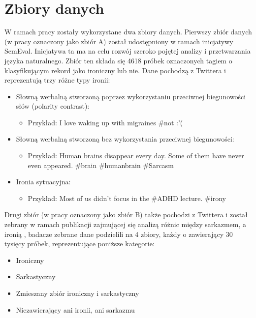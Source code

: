 \newpage %
\section{Zbiory danych} \label{dane_wejsciowe}



W ramach pracy zostały wykorzystane dwa zbiory danych. Pierwszy zbiór danych (w pracy oznaczony jako zbiór A) został udostępniony w ramach inicjatywy SemEval. Inicjatywa ta ma na celu rozwój szeroko pojętej analizy i przetwarzania języka naturalnego. Zbiór ten składa się 4618 próbek oznaczonych tagiem o klasyfikującym rekord jako ironiczny lub nie. Dane pochodzą z Twittera i reprezentują trzy różne typy ironii:
\begin{itemize}
    \item Słowną werbalną stworzoną poprzez wykorzystaniu przeciwnej biegunowości słów (polarity contrast):
          \begin{itemize}
              \item Przykład: I love waking up with migraines \#not :'(
          \end{itemize}

    \item Słowną werbalną stworzoną bez wykorzystania przeciwnej biegunowości:
          \begin{itemize}
              \item Przykład: Human brains disappear every day. Some of them have never even appeared. \#brain \#humanbrain \#Sarcasm
          \end{itemize}

    \item Ironia sytuacyjna:
          \begin{itemize}
              \item Przykład: Most of us didn't focus in the \#ADHD lecture. \#irony
          \end{itemize}
\end{itemize}



Drugi zbiór (w pracy oznaczony jako zbiór B) także pochodzi z Twittera i został zebrany w ramach publikacji zajmującej się analizą różnic między sarkazmem, a ironią  \cite{Ling2016}  , badacze zebrane dane podzielili na 4 zbiory, każdy o zawierający 30 tysięcy próbek,  reprezentujące poniższe kategorie:
\begin{itemize}
    \item Ironiczny
    \item Sarkastyczny
    \item Zmieszany zbiór ironiczny i sarkastyczny
    \item Niezawierający ani ironii, ani sarkazmu

\end{itemize}

